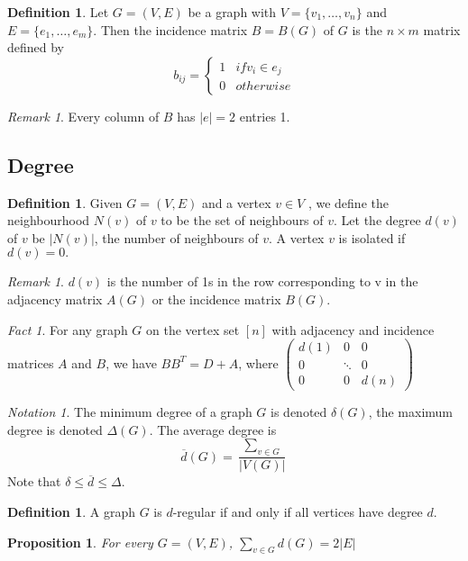 \documentclass[11pt, fleqn, a4paper, landscape]{article}
\theoremstyle{plain} %
\newtheorem{pro}[thm]{Proposition}
\theoremstyle{remark} %
\newtheorem{rem}[thm]{Remark}
\newtheorem{nota}[thm]{Notation}
\newtheorem{fact}{Fact}
\theoremstyle{definition} %
\newtheorem{defi}[thm]{Definition}
\begin{document}
\begin{multicols}{3}
\begin{defi}
Let $G = (V,E)$ be a graph with $V = \{v_1, \dots , v_n\}$ and $E = \{e_1, \dots , e_m\}$. Then the incidence matrix $B = B(G)$ of $G$ is the $n\times m$ matrix defined by \[b_{ij}=\begin{cases}1 & if v_i\in e_j\\ 0 & otherwise\end{cases}\]
\end{defi}
\addtocounter{thm}{1}
\begin{rem}
Every column of $B$ has $|e| = 2$ entries 1.
\end{rem}

\subsection{Degree}

\begin{defi}
Given $G = (V,E)$ and a vertex $v \in V$ , we define the neighbourhood $N(v)$ of $v$ to
be the set of neighbours of $v$. Let the degree $d(v)$ of $v$ be $|N(v)|$, the number of neighbours of $v$. A vertex $v$ is isolated if $d(v) = 0.$
\end{defi}
\begin{rem}
$d(v)$ is the number of 1s in the row corresponding to v in the adjacency matrix $A(G)$ or the incidence matrix $B(G)$.
\end{rem} 
\addtocounter{thm}{1}
\begin{fact}
For any graph $G$ on the vertex set $[n]$ with adjacency and incidence matrices $A$ and $B$, we have $BB^T = D + A$, where
$
\begin{pmatrix}
d(1) & 0 & 0  \\
0 & \ddots & 0  \\
0 & 0 & d(n)  
\end{pmatrix}
$  
\end{fact}

\begin{nota}
The minimum degree of a graph $G$ is denoted $\delta(G)$, the maximum degree is denoted $\Delta(G)$. The average degree is \[\overline{d}(G) =\frac{\sum_{v\in G}}{|V(G)|}\] Note that $\delta\le\overline{d}\le\Delta$.
\end{nota}

\begin{defi}
A graph $G$ is $d$-regular if and only if all vertices have degree $d$.
\end{defi}
\addtocounter{thm}{1}
\begin{pro}
For every $G = (V,E)$, $\sum_{v\in G}d(G)=2|E|$
\end{pro}


\end{multicols}
\end{document}

